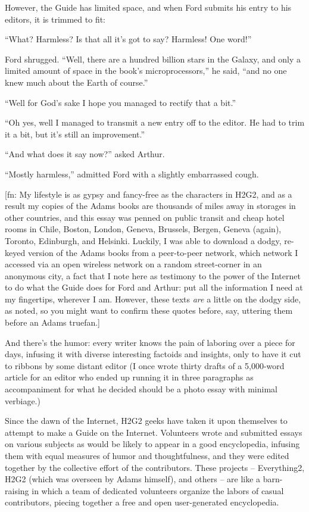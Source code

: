 However, the Guide has limited space, and when Ford submits his
entry to his editors, it is trimmed to fit:

``What? Harmless? Is that all it's got to say? Harmless! One word!''

Ford shrugged. ``Well, there are a hundred billion stars in the
Galaxy, and only a limited amount of space in the book's
microprocessors,'' he said, ``and no one knew much about the Earth of
course.''

``Well for God's sake I hope you managed to rectify that a bit.''

``Oh yes, well I managed to transmit a new entry off to the editor.
He had to trim it a bit, but it's still an improvement.''

``And what does it say now?'' asked Arthur.

``Mostly harmless,'' admitted Ford with a slightly embarrassed
cough.

[fn: My lifestyle is as gypsy and fancy-free as the characters in
H2G2, and as a result my copies of the Adams books are thousands of
miles away in storages in other countries, and this essay was
penned on public transit and cheap hotel rooms in Chile, Boston,
London, Geneva, Brussels, Bergen, Geneva (again), Toronto,
Edinburgh, and Helsinki. Luckily, I was able to download a dodgy,
re-keyed version of the Adams books from a peer-to-peer network,
which network I accessed via an open wireless network on a random
street-corner in an anonymous city, a fact that I note here as
testimony to the power of the Internet to do what the Guide does
for Ford and Arthur: put all the information I need at my
fingertips, wherever I am. However, these texts \emph{are} a
little on the dodgy side, as noted, so you might want to confirm
these quotes before, say, uttering them before an Adams truefan.]

And there's the humor: every writer knows the pain of laboring over
a piece for days, infusing it with diverse interesting factoids and
insights, only to have it cut to ribbons by some distant editor (I
once wrote thirty drafts of a 5,000-word article for an editor who
ended up running it in three paragraphs as accompaniment for what
he decided should be a photo essay with minimal verbiage.)

Since the dawn of the Internet, H2G2 geeks have taken it upon
themselves to attempt to make a Guide on the Internet. Volunteers
wrote and submitted essays on various subjects as would be likely
to appear in a good encyclopedia, infusing them with equal measures
of humor and thoughtfulness, and they were edited together by the
collective effort of the contributors. These projects --
Everything2, H2G2 (which was overseen by Adams himself), and others
-- are like a barn-raising in which a team of dedicated volunteers
organize the labors of casual contributors, piecing together a free
and open user-generated encyclopedia.

